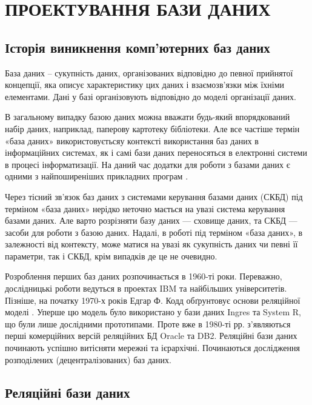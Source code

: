 \section{ПРОЕКТУВАННЯ БАЗИ ДАНИХ}

\subsection{Історія виникнення комп’ютерних баз даних}

База даних – сукупність даних, організованих відповідно до певної прийнятої концепції, яка описує характеристику цих даних і взаємозв'язки між їхніми елементами. Дані у базі організовують відповідно до моделі організації даних. 

В загальному випадку базою даних можна вважати будь-який впорядкований набір даних, наприклад, паперову картотеку бібліотеки. Але все частіше термін «база даних» використовуєтьсяу контексті використання баз даних в інформаційних системах, як і самі бази даних переносяться в електронні системи в процесі інформатизації. На даний час додатки для роботи з базами даних є одними з найпоширеніших прикладних програм \cite{ситник2004проектування}.

Через тісний зв'язок баз даних з системами керування базами даних (СКБД) під терміном «база даних» нерідко неточно мається на увазі система керування базами даних. Але варто розрізняти базу даних — сховище даних, та СКБД — засоби для роботи з базою даних. Надалі, в роботі під терміном «база даних», в залежності від контексту, може матися на увазі як сукупність даних чи певні її параметри, так і СКБД, крім випадків де це не очевидно.

Розроблення перших баз даних розпочинається в 1960-ті роки. Переважно, дослідницькі роботи ведуться в проектах IBM та найбільших університетів. Пізніше, на початку 1970-х років Едгар Ф. Кодд обґрунтовує основи реляційної моделі \cite{codd1970relational}. Уперше цю модель було використано у бази даних Ingres та System R, що були лише дослідними прототипами. Проте вже в 1980-ті рр. з’являються перші комерційних версій реляційних БД Oracle та DB2. Реляційні бази даних починають успішно витісняти мережні та ієрархічні. Починаються дослідження розподілених (децентралізованих) баз даних.

\subsection{Реляційні бази даних}\label{subsection:relationModel}

